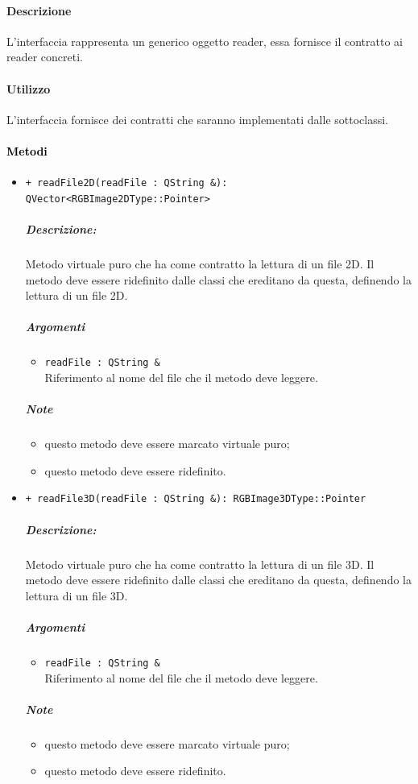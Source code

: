 \paragraph{Descrizione \\}
L'interfaccia rappresenta un generico oggetto reader, essa fornisce il contratto ai reader concreti.
\paragraph{Utilizzo\\}
L'interfaccia fornisce dei contratti che saranno implementati dalle sottoclassi.

\paragraph{\textcolor{black}{Metodi}}
\begin{itemize}
	\item \color{blue}\verb!+ readFile2D(readFile : QString &): QVector<RGBImage2DType::Pointer>!
	\color{black}
		\subparagraph{Descrizione:} Metodo virtuale puro che ha come contratto la lettura di un file 2D. Il metodo deve essere ridefinito dalle classi che ereditano da questa, definendo la lettura di un file 2D.

		\subparagraph{Argomenti}
			\begin{itemize}
				\item \color{RoyalPurple}\verb!readFile : QString &! \\
				\color{black} Riferimento al nome del file che il metodo deve leggere.
			\end{itemize}

		\subparagraph{Note}
			\begin{itemize}
				\item questo metodo deve essere marcato virtuale puro;
				\item questo metodo deve essere ridefinito.
			\end{itemize}
	\item \color{blue}\verb!+ readFile3D(readFile : QString &): RGBImage3DType::Pointer!
	\color{black}
		\subparagraph{Descrizione:}  Metodo virtuale puro che ha come contratto la lettura di un file 3D. Il metodo deve essere ridefinito dalle classi che ereditano da questa, definendo la lettura di un file 3D.

		\subparagraph{Argomenti}
			\begin{itemize}
				\item \color{RoyalPurple}\verb!readFile : QString &! \\ 
				\color{black}Riferimento al nome del file che il metodo deve leggere.
			\end{itemize}

		\subparagraph{Note}
			\begin{itemize}
				\item questo metodo deve essere marcato virtuale puro;
				\item questo metodo deve essere ridefinito.
			\end{itemize}
\end{itemize}
\color{black}

